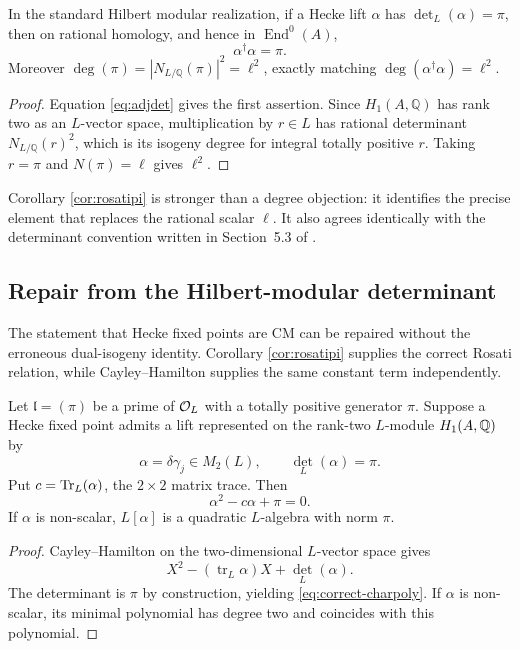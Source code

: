 \begin{corollary}\label{cor:rosatipi}
In the standard Hilbert modular realization, if a Hecke lift $\alpha$ has $\det_L(\alpha)=\pi$, then on rational homology, and hence in $\operatorname{End}^0(A)$,
\[
  \boxed{\alpha^{\dagger}\alpha=\pi}.
\]
Moreover $\deg(\pi)=|N_{L/\mathbb Q}(\pi)|^2=\ell^2$, exactly matching $\deg(\alpha^{\dagger}\alpha)=\ell^2$.
\end{corollary}
\begin{proof}
Equation \eqref{eq:adjdet} gives the first assertion.  Since $H_1(A,\mathbb Q)$ has rank two as an $L$-vector space, multiplication by $r\in L$ has rational determinant $N_{L/\mathbb Q}(r)^2$, which is its isogeny degree for integral totally positive $r$.  Taking $r=\pi$ and $N(\pi)=\ell$ gives $\ell^2$.
\end{proof}

Corollary \ref{cor:rosatipi} is stronger than a degree objection: it identifies the precise element that replaces the rational scalar $\ell$.  It also agrees identically with the determinant convention written in Section~5.3 of \cite{Mostaed2026}.


\subsection{Repair from the Hilbert-modular determinant}
The statement that Hecke fixed points are CM can be repaired without the erroneous dual-isogeny identity.  Corollary \ref{cor:rosatipi} supplies the correct Rosati relation, while Cayley--Hamilton supplies the same constant term independently.

\begin{proposition}\label{prop:charpoly}
Let $\mathfrak l=(\pi)$ be a prime of $\mathcal O_L$ with a totally positive generator $\pi$. Suppose a Hecke fixed point admits a lift represented on the rank-two $L$-module $H_1(A,\mathbb Q)$ by
\[
 \alpha=\delta\gamma_j\in M_2(L),\qquad \det_L(\alpha)=\pi.
\]
Put $c=\operatorname{Tr}_L(\alpha)$, the $2\times2$ matrix trace. Then
\begin{equation}\label{eq:correct-charpoly}
 \alpha^2-c\alpha+\pi=0.
\end{equation}
If $\alpha$ is non-scalar, $L[\alpha]$ is a quadratic $L$-algebra with norm $\pi$.
\end{proposition}
\begin{proof}
Cayley--Hamilton on the two-dimensional $L$-vector space gives
\[
 X^2-(\operatorname{tr}_L\alpha)X+\det_L(\alpha).
\]
The determinant is $\pi$ by construction, yielding \eqref{eq:correct-charpoly}. If $\alpha$ is non-scalar, its minimal polynomial has degree two and coincides with this polynomial.
\end{proof}


